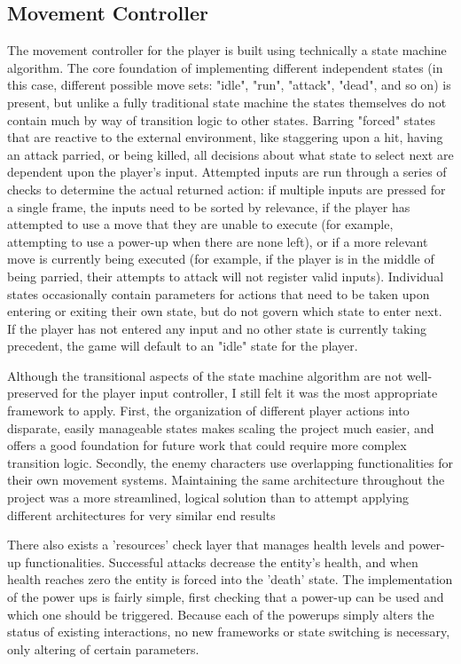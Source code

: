 \documentclass[10pt,twocolumn]{article}
\begin{document}
\subsection{Movement Controller}
The movement controller for the player is built using technically a state machine algorithm. The core foundation of implementing different independent states (in this case, different possible move sets: "idle", "run", "attack", "dead", and so on) is present, but unlike a fully traditional state machine the states themselves do not contain much by way of transition logic to other states. Barring "forced" states that are reactive to the external environment, like staggering upon a hit, having an attack parried, or being killed, all decisions about what state to select next are dependent upon the player's input. Attempted inputs are run through a series of checks to determine the actual returned action: if multiple inputs are pressed for a single frame, the inputs need to be sorted by relevance, if the player has attempted to use a move that they are unable to execute (for example, attempting to use a power-up when there are none left), or if a more relevant move is currently being executed (for example, if the player is in the middle of being parried, their attempts to attack will not register valid inputs). Individual states occasionally contain parameters for actions that need to be taken upon entering or exiting their own state, but do not govern which state to enter next. If the player has not entered any input and no other state is currently taking precedent, the game will default to an "idle" state for the player.

Although the transitional aspects of the state machine algorithm are not well-preserved for the player input controller, I still felt it was the most appropriate framework to apply. First, the organization of different player actions into disparate, easily manageable states makes scaling the project much easier, and offers a good foundation for future work that could require more complex transition logic. Secondly, the enemy characters use overlapping functionalities for their own movement systems. Maintaining the same architecture throughout the project was a more streamlined, logical solution than to attempt applying different architectures for very similar end results

There also exists a 'resources' check layer that manages health levels and power-up functionalities. Successful attacks decrease the entity's health, and when health reaches zero the entity is forced into the 'death' state. The implementation of the power ups is fairly simple, first checking that a power-up can be used and which one should be triggered. Because each of the powerups simply alters the status of existing interactions, no new frameworks or state switching is necessary, only altering of certain parameters.
\end{document}

